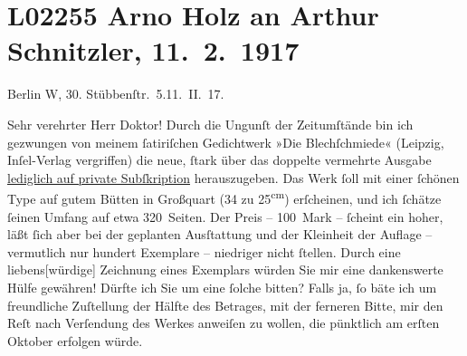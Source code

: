 

\section[Arno Holz an Arthur Schnitzler, 11. 2. 1917]{L02255 Arno Holz an Arthur Schnitzler, 11. 2. 1917}
\nopagebreak{}
\rehead{ }\normalsize\beginnumbering{}
\toendnotes[C]{\smallbreak\pagebreak[2]}
\pstart
           \raggedleft{}{\pb}Berlin W, 30. Stübbenſtr. 5.\hspace*{1.5em}11. II. 17. \pend
           
\pstart\center{}Sehr verehrter Herr Doktor!\pend\vspace{0.5em}
\pstart
           Durch die Ungunſt der Zeitumſtände bin ich gezwungen von meinem ſatiriſchen
               Gedichtwerk »Die Blechſchmiede« (Leipzig, Inſel-Verlag vergriffen) die neue, ſtark über das doppelte vermehrte Ausgabe
                  \uline{lediglich auf private Subſkription} herauszugeben.
               Das Werk ſoll mit einer ſchönen Type auf gutem Bütten in Großquart (34 zu 25\textsuperscript{cm}) erſcheinen, und ich ſchätze ſeinen Umfang auf etwa
               320 Seiten. Der Preis – 100 Mark – ſcheint ein hoher, läßt ſich aber bei der
               geplanten Ausſtattung und der Kleinheit der Auflage – vermutlich nur hundert
               Exemplare – niedriger nicht ſtellen. Durch eine liebens{[}würdige{]}
               Zeichnung eines Exemplars würden Sie mir eine dankenswerte Hülfe gewähren! Dürfte ich
               Sie um eine ſolche bitten? Falls ja, ſo bäte ich um freundliche Zuſtellung der Hälfte
               des Betrages, mit der ferneren Bitte, mir den Reſt nach Verſendung des Werkes
               anweiſen zu wollen, die pünktlich am erſten Oktober erfolgen würde.\pend
           
